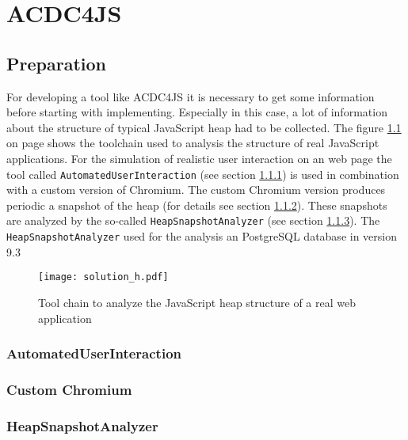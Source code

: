 %
%

\chapter{ACDC4JS}

\section{Preparation}
	For developing a tool like ACDC4JS it is necessary to get some information before starting with implementing. Especially in this case, a lot of information about the structure of typical JavaScript heap had to be collected. The figure \ref{fig:heap_structure_analysis} on page \pageref{fig:heap_structure_analysis} shows the toolchain used to analysis the structure of real JavaScript applications. For the simulation of realistic user interaction on an web page the tool called \texttt{AutomatedUserInteraction} (see section \ref{sec:automated_user_interaction}) is used in combination with a custom version of Chromium. The custom Chromium version produces periodic a snapshot of the heap (for details see section \ref{sec:custom_chromium}). These snapshots are analyzed by the so-called \texttt{HeapSnapshotAnalyzer} (see section \ref{sec:heap_snapshot_analyzer}). The \texttt{HeapSnapshotAnalyzer} used for the analysis an PostgreSQL database in version 9.3 \cite{PSQL13}

	\begin{figure}
		\texttt{[image: solution\_h.pdf]}
		\caption{Tool chain to analyze the JavaScript heap structure of a real web application}
		\label{fig:heap_structure_analysis}
	\end{figure}

	\subsection{AutomatedUserInteraction} \label{sec:automated_user_interaction}
	\subsection{Custom Chromium} \label{sec:custom_chromium}
	\subsection{HeapSnapshotAnalyzer} \label{sec:heap_snapshot_analyzer}

